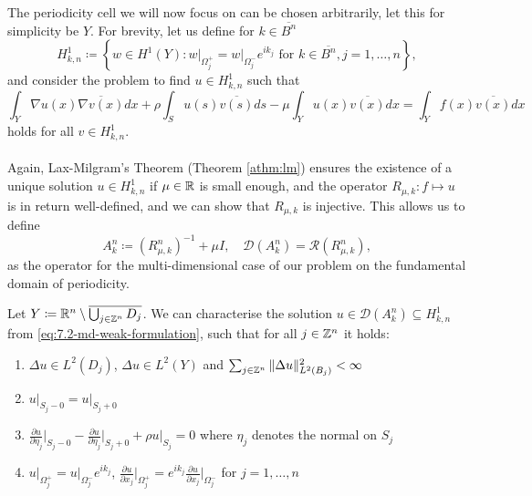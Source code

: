 The periodicity cell we will now focus on can be chosen arbitrarily, let this for simplicity be $Y$. For brevity, let us define for $k \in \overline{B^{n}}$ 
\[ H^{1}_{k, n} \coloneqq \left\{ w \in H^{1}(Y) \colon w \big|_{\Omega_{j}^{+}} = w \big|_{\Omega_{j}^{-}} e^{i k_{j}} \text{ for } k \in \overline{B^{n}}, j = 1,\dotsc, n \right\}, \]
 and consider the problem to find $u \in H^{1}_{k, n}$ such that
	\begin{equation}
		\int_{Y} \nabla u(x) \overline{\nabla v(x)} dx + \rho \int_{S} u(s) \overline{v(s)} ds - \mu \int_{Y} u(x) \overline{v(x)} dx = \int_{Y} f(x) \overline{v(x)} dx \label{eq:7.3-md_weak_formulation_res}
	\end{equation} 
holds for all $v \in H^{1}_{k, n}$. 
~\\ ~\\
Again, Lax-Milgram's Theorem (Theorem \ref{athm:lm}) ensures the existence of a unique solution $u \in H^{1}_{k, n}$ if $\mu \in \mathbb{R}$ is small enough, and the operator $R_{\mu, k} \colon f \mapsto u$ is in return well-defined, and we can show that $R_{\mu, k}$ is injective. This allows us to define 
	\[ A_{k}^{n} \coloneqq \left(R_{\mu, k}^{n}\right)^{-1} + \mu I, \quad \mathcal{D}(A_{k}^{n}) = \mathcal{R}(R_{\mu, k}^{n}), \]
as the operator for the multi-dimensional case of our problem on the fundamental domain of periodicity.

\begin{theorem} Let $Y \coloneqq \mathbb{R}^{n} \setminus \overline{\bigcup_{j \in \mathbb{Z}^{n}} D_{j}}$. We can characterise the solution $u \in \mathcal{D}(A^{n}_{k}) \subseteq H^{1}_{k, n}$ from \eqref{eq:7.2-md-weak-formulation}, such that for all $j \in \mathbb{Z}^{n}$ it holds:
	\begin{enumerate}[label=\alph*\upshape)]
		\item $\Delta u \in L^{2}(D_{j})$, $\Delta u \in L^{2}(Y)$ and $\sum_{j \in \mathbb{Z}^{n}} \|\Delta u \|_{L^{2}(B_{j})}^{2} < \infty$
		\item $u \big|_{S_{j} - 0} = u \big|_{S_{j} + 0}$
		\item $\frac{\partial u}{\partial \eta_{j}} \big|_{S_{j} - 0} - \frac{\partial u}{\partial \eta_{j}} \big|_{S_{j} + 0} + \rho u \big|_{S_{j}} = 0$ where $\eta_{j}$ denotes the normal on $S_{j}$
		\item $u \big|_{\Omega_{j}^{+}} = u \big|_{\Omega_{j}^{-}} e^{i k_{j}}$, $\frac{\partial u}{\partial x_{j}}\big|_{\Omega_{j}^{+}} = e^{ik_{j}} \frac{\partial u}{\partial x_{j}}\big|_{\Omega_{j}^{-}}$ for $j = 1, \dotsc, n $
	\end{enumerate}
\end{theorem}
	
